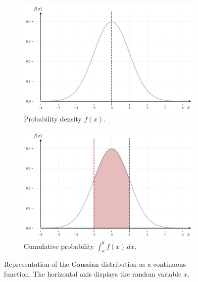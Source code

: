 \documentclass{book}
\begin{document}
\begin{figure}[ht]
    \centering
    \begin{subfigure}[b]{0.48\textwidth}
        \centering
        \includegraphics[width=\textwidth, height=0.7\textwidth]{figures/chapter2/gaussian_1.png}
        \caption{Probability density $f(x)$.}
        \label{fig:gaussian1}
    \end{subfigure}
    \hfill
    \begin{subfigure}[b]{0.48\textwidth}
        \centering
        \includegraphics[width=\textwidth, height=0.7\textwidth]{figures/chapter2/gaussian_2.png}
        \caption{Cumulative probability $\int_a^b f(x) \, dx$.}
        \label{fig:gaussian2}
    \end{subfigure}
    \caption{Representation of the Gaussian distribution as a continuous function. The horizontal axis displays the random variable $x$.}
    \label{fig:gaussian_comparison}
\end{figure}
\end{document}
